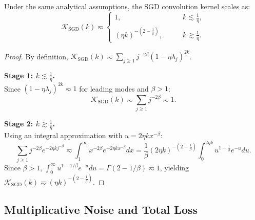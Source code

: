 \begin{lemma}
\label{lem:sgd_kernel}
Under the same analytical assumptions, the SGD convolution kernel scales as:
\begin{equation*}
    \mathcal{K}_{\mathrm{SGD}}(k) \eqsim 
    \begin{cases}
    1, & \qquad k \lesssim \frac{1}{\eta}, \\
    (\eta k)^{-\left(2-\frac{1}{\beta}\right)}, & \qquad k \gtrsim \frac{1}{\eta}.
    \end{cases}
\end{equation*}
\end{lemma}
\begin{proof}
By definition, $\mathcal{K}_{\mathrm{SGD}}(k) \eqsim \sum_{j\ge 1} j^{-2\beta} (1-\eta\lambda_j)^{2k}$.

\textbf{Stage 1: $k \lesssim \frac{1}{\eta}$.} \\
Since $(1-\eta\lambda_j)^{2k} \eqsim 1$ for leading modes and $\beta > 1$:
\[
    \mathcal{K}_{\mathrm{SGD}}(k) \eqsim \sum_{j\ge 1} j^{-2\beta} \eqsim 1.
\]

\textbf{Stage 2: $k \gtrsim \frac{1}{\eta}$.} \\
Using an integral approximation with $u = 2\eta k x^{-\beta}$:
\[
    \sum_{j\ge 1} j^{-2\beta} e^{-2\eta k j^{-\beta}} \eqsim \int_1^\infty x^{-2\beta} e^{-2\eta k x^{-\beta}} dx = \frac{1}{\beta} (2\eta k)^{-\left(2-\frac{1}{\beta}\right)} \int_0^{2\eta k} u^{1-\frac{1}{\beta}} e^{-u} du.
\]
Since $\beta > 1$, $\int_0^{\infty} u^{1-1/\beta} e^{-u} du = \Gamma(2 - 1/\beta) \eqsim 1$, yielding $\mathcal{K}_{\mathrm{SGD}}(k) \eqsim (\eta k)^{-\left(2-\frac{1}{\beta}\right)}$.
\end{proof}

\subsection{Multiplicative Noise and Total Loss}
\label{app:sgd_noise_bounds}

